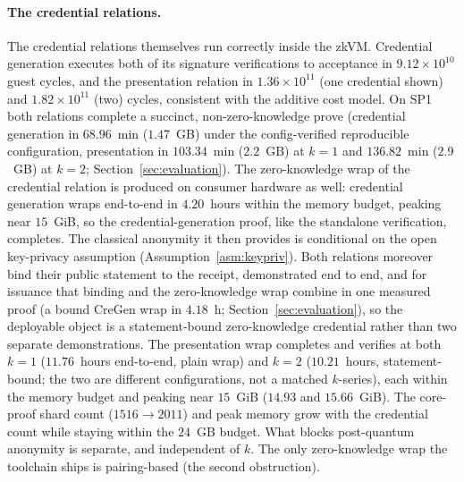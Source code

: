 \paragraph{The credential relations.}
The credential relations themselves run correctly inside the zkVM. Credential generation executes both of its signature verifications to acceptance in $9.12\times10^{10}$ guest cycles, and the presentation relation in $1.36\times10^{11}$ (one credential shown) and $1.82\times10^{11}$ (two) cycles, consistent with the additive cost model. On SP1 both relations complete a succinct, non-zero-knowledge prove (credential generation in $68.96$~min ($1.47$~GB) under the config-verified reproducible configuration, presentation in $103.34$~min ($2.2$~GB) at $k{=}1$ and $136.82$~min ($2.9$~GB) at $k{=}2$; Section~\ref{sec:evaluation}). The zero-knowledge wrap of the credential relation is produced on consumer hardware as well: credential generation wraps end-to-end in $4.20$~hours within the memory budget, peaking near $15$~GiB, so the credential-generation proof, like the standalone verification, completes. The classical anonymity it then provides is conditional on the open key-privacy assumption (Assumption~\ref{asm:keypriv}). Both relations moreover bind their public statement to the receipt, demonstrated end to end, and for issuance that binding and the zero-knowledge wrap combine in one measured proof (a bound CreGen wrap in $4.18$~h; Section~\ref{sec:evaluation}), so the deployable object is a statement-bound zero-knowledge credential rather than two separate demonstrations. The presentation wrap completes and verifies at both $k=1$ ($11.76$~hours end-to-end, plain wrap) and $k=2$ ($10.21$~hours, statement-bound; the two are different configurations, not a matched $k$-series), each within the memory budget and peaking near $15$~GiB ($14.93$ and $15.66$~GiB). The core-proof shard count ($1516\to2011$) and peak memory grow with the credential count while staying within the $24$~GB budget. What blocks post-quantum anonymity is separate, and independent of $k$. The only zero-knowledge wrap the toolchain ships is pairing-based (the second obstruction).

